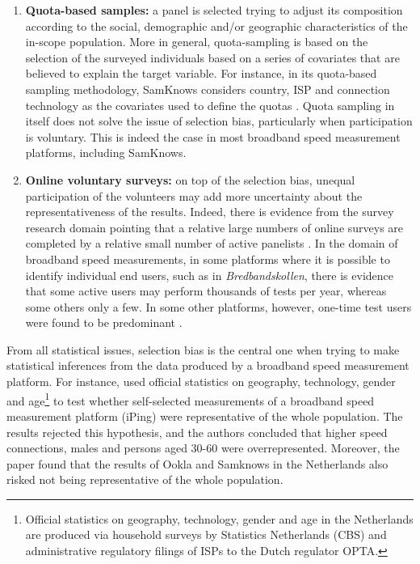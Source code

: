 \documentclass[12pt]{article}
\begin{document}
\begin{enumerate}
	\item \textbf{Quota-based samples:} a panel is selected trying to adjust its composition according to the social, demographic and/or geographic characteristics of the in-scope population. More in general, quota-sampling is based on the selection of the surveyed individuals based on a series of covariates that are believed to explain the target variable. For instance, in its quota-based sampling methodology, SamKnows considers country, ISP and connection technology as the covariates used to define the quotas \citep{samknows2013}. Quota sampling in itself does not solve the issue of selection bias, particularly when participation is voluntary. This is indeed the case in most broadband speed measurement platforms, including SamKnows.
	
	\item \textbf{Online voluntary surveys:} on top of the selection bias, unequal participation of the volunteers may add more uncertainty about the representativeness of the results. Indeed,  there is evidence from the survey research domain pointing that a relative large numbers of online surveys are completed by a relative small number of active panelists \citep{couper2013}. In the domain of broadband speed measurements, in some platforms where it is possible to identify individual end users, such as in \textit{Bredbandskollen}, there is evidence that some active users may perform thousands of tests per year, whereas some others only a few. In some other platforms, however, one-time test users were found to be predominant \citep{wattegama2011}. 
\end{enumerate}
	
From all statistical issues, selection bias is the central one when trying to make statistical inferences from the data produced by a broadband speed measurement platform. For instance, \cite{opt2012} used official statistics on geography, technology, gender and age\footnote{Official statistics on geography, technology, gender and age in the Netherlands are produced via household surveys by Statistics Netherlands (CBS) and administrative regulatory filings of ISPs to the Dutch regulator OPTA.} to test whether self-selected measurements of a broadband speed measurement platform (iPing) were representative of the whole population. The results rejected this hypothesis, and the authors concluded that higher speed connections, males and persons aged 30-60 were overrepresented. Moreover, the paper found that the results of Ookla and Samknows in the Netherlands also risked not being representative of the whole population.
\end{document}
